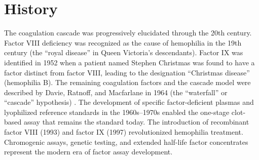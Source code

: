 \section*{History}
The coagulation cascade was progressively elucidated through the 20th century. Factor VIII deficiency was recognized as the cause of hemophilia in the 19th century (the ``royal disease'' in Queen Victoria's descendants). Factor IX was identified in 1952 when a patient named Stephen Christmas was found to have a factor distinct from factor VIII, leading to the designation ``Christmas disease'' (hemophilia B). The remaining coagulation factors and the cascade model were described by Davie, Ratnoff, and Macfarlane in 1964 (the ``waterfall'' or ``cascade'' hypothesis) \cite{davie1964waterfall,macfarlane1964enzyme}. The development of specific factor-deficient plasmas and lyophilized reference standards in the 1960s--1970s enabled the one-stage clot-based assay that remains the standard today. The introduction of recombinant factor VIII (1993) and factor IX (1997) revolutionized hemophilia treatment. Chromogenic assays, genetic testing, and extended half-life factor concentrates represent the modern era of factor assay development.

